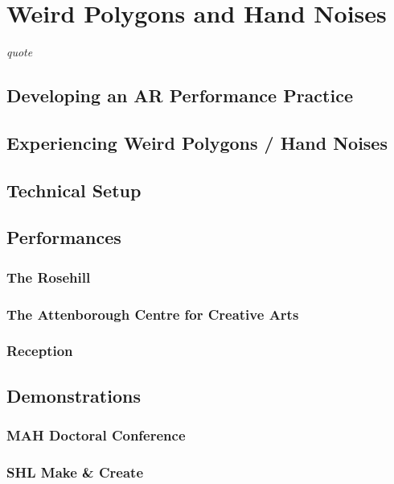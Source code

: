 \chapter{Weird Polygons and Hand Noises}
\label{sec: performance}
\epigraph{\emph{quote}}{\citep[]{bilbow2022}}



\section{Developing an AR Performance Practice} \label{sec: performance-developing}




\section{Experiencing Weird Polygons / Hand Noises} \label{sec: performance-experience}



\section{Technical Setup} \label{sec: performance-setup}




\section{Performances} \label{sec: performance-performances}
\subsection{The Rosehill} \label{sec: performance-performances-rosehill}
\subsection{The Attenborough Centre for Creative Arts} \label{sec: performance-performances-acca}
\subsection{Reception} \label{sec: performance-performances-reception}



\section{Demonstrations} \label{sec: performance-demonstrations}
\subsection{MAH Doctoral Conference} \label{sec: performance-demonstrations-mah}
\subsection{SHL Make \& Create} \label{sec: performance-demonstrations-shl}
